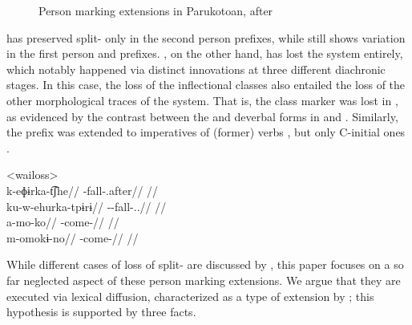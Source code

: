 \begin{figure}[hbt]
\centering
\setlength{\tabcolsep}{2pt}
  \caption{Person marking extensions in Parukotoan, after \textcite[94]{gildea1998}}
  \label{fig:par_ext}
\end{figure}

\hixka has preserved split- only in the second person prefixes, while \kaxui still shows variation in the first person and  prefixes.
\waiwai, on the other hand, has lost the system entirely, which notably happened via distinct innovations at three different diachronic stages.
In this case, the loss of the inflectional classes also entailed the loss of the other morphological traces of the system.
That is, the  class marker   was lost in \waiwai, as evidenced by the contrast between the \waiwai and \kaxui deverbal forms in  and .
Similarly, the  prefix  was extended to imperatives of (former)  verbs , but only C-initial ones \parencite[62]{waiwaihawkins1998}.

\pex<wailoss>
 \waiwai \parencite[][98]{waiwaihawkins1998}\\
\begingl
\gla k-eɸɨrka-t͡ʃhe//
\glb {}-fall-.after//
\glft {}//
\endgl
{} \kaxui \parencite[][49]{schuring2018kaxuyana}\\
\begingl
\gla ku-w-ehurka-tpɨrɨ//
\glb {}--fall-..//
\glft {}//
\endgl
{} \waiwai \parencite[][177]{waiwaihawkins1998}\\
\begingl
\gla a-mo-ko//
\glb {}-come-//
\glft {}//
\endgl
{} \hixka \parencite[][191]{hixkaryanaderby1985}\\
\begingl
\gla m-omokɨ-no//
\glb {}-come-//
\glft {}//
\endgl
\xe


While different cases of loss of split- are discussed by \textcite[91--96]{gildea1998}, this paper focuses on a so far neglected aspect of these person marking extensions.
We argue that they are executed via lexical diffusion, characterized as a type of extension by \textcite[106--115]{harris1995historical}; this hypothesis is supported by three facts.

